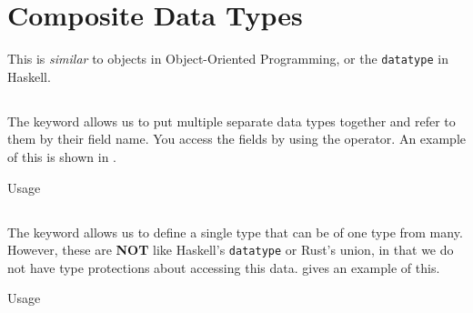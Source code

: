 \section{Composite Data Types}\label{sec:Composite_Data_Types}
This is \textit{similar} to objects in Object-Oriented Programming, or the \texttt{datatype} in Haskell.

\subsection{\texorpdfstring{}{\texttt{struct}}}\label{subsec:struct}
The  keyword allows us to put multiple separate data types together and refer to them by their field name.
You access the fields by using the  operator.
An example of this is shown in .

\begin{listing}[h!tbp]
\caption{\texorpdfstring{}{\texttt{struct}} Usage}
\label{lst:struct_Usage}
\end{listing}

\subsection{\texorpdfstring{}{\texttt{union}}}\label{subsec:union}
The  keyword allows us to define a single type that can be of one type from many.
However, these are \textbf{NOT} like Haskell's \texttt{datatype} or Rust's union, in that we do not have type protections about accessing this data.
 gives an example of this.

\begin{listing}[h!tbp]
\caption{\texorpdfstring{}{\texttt{union}} Usage}
\label{lst:union_Usage}
\end{listing}


